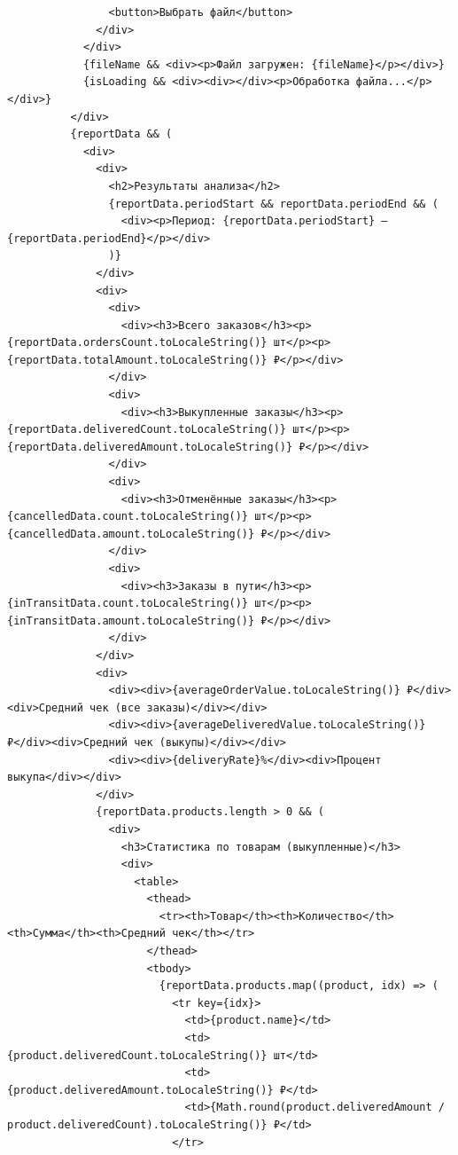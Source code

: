 \begin{code}
\begin{verbatim}
                <button>Выбрать файл</button>
              </div>
            </div>
            {fileName && <div><p>Файл загружен: {fileName}</p></div>}
            {isLoading && <div><div></div><p>Обработка файла...</p></div>}
          </div>
          {reportData && (
            <div>
              <div>
                <h2>Результаты анализа</h2>
                {reportData.periodStart && reportData.periodEnd && (
                  <div><p>Период: {reportData.periodStart} — {reportData.periodEnd}</p></div>
                )}
              </div>
              <div>
                <div>
                  <div><h3>Всего заказов</h3><p>{reportData.ordersCount.toLocaleString()} шт</p><p>{reportData.totalAmount.toLocaleString()} ₽</p></div>
                </div>
                <div>
                  <div><h3>Выкупленные заказы</h3><p>{reportData.deliveredCount.toLocaleString()} шт</p><p>{reportData.deliveredAmount.toLocaleString()} ₽</p></div>
                </div>
                <div>
                  <div><h3>Отменённые заказы</h3><p>{cancelledData.count.toLocaleString()} шт</p><p>{cancelledData.amount.toLocaleString()} ₽</p></div>
                </div>
                <div>
                  <div><h3>Заказы в пути</h3><p>{inTransitData.count.toLocaleString()} шт</p><p>{inTransitData.amount.toLocaleString()} ₽</p></div>
                </div>
              </div>
              <div>
                <div><div>{averageOrderValue.toLocaleString()} ₽</div><div>Средний чек (все заказы)</div></div>
                <div><div>{averageDeliveredValue.toLocaleString()} ₽</div><div>Средний чек (выкупы)</div></div>
                <div><div>{deliveryRate}%</div><div>Процент выкупа</div></div>
              </div>
              {reportData.products.length > 0 && (
                <div>
                  <h3>Статистика по товарам (выкупленные)</h3>
                  <div>
                    <table>
                      <thead>
                        <tr><th>Товар</th><th>Количество</th><th>Сумма</th><th>Средний чек</th></tr>
                      </thead>
                      <tbody>
                        {reportData.products.map((product, idx) => (
                          <tr key={idx}>
                            <td>{product.name}</td>
                            <td>{product.deliveredCount.toLocaleString()} шт</td>
                            <td>{product.deliveredAmount.toLocaleString()} ₽</td>
                            <td>{Math.round(product.deliveredAmount / product.deliveredCount).toLocaleString()} ₽</td>
                          </tr>

\end{verbatim}
\end{code}
